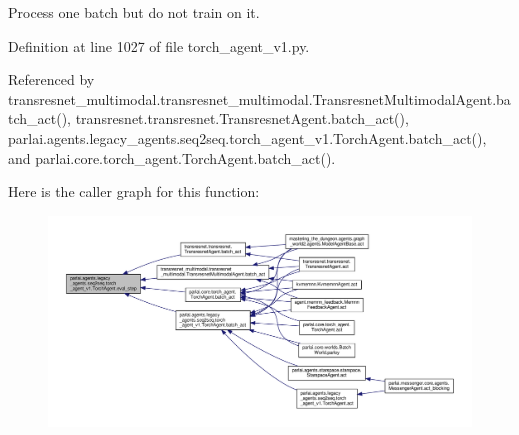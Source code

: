 \begin{DoxyVerb}Process one batch but do not train on it.\end{DoxyVerb}
 

Definition at line 1027 of file torch\+\_\+agent\+\_\+v1.\+py.



Referenced by transresnet\+\_\+multimodal.\+transresnet\+\_\+multimodal.\+Transresnet\+Multimodal\+Agent.\+batch\+\_\+act(), transresnet.\+transresnet.\+Transresnet\+Agent.\+batch\+\_\+act(), parlai.\+agents.\+legacy\+\_\+agents.\+seq2seq.\+torch\+\_\+agent\+\_\+v1.\+Torch\+Agent.\+batch\+\_\+act(), and parlai.\+core.\+torch\+\_\+agent.\+Torch\+Agent.\+batch\+\_\+act().

Here is the caller graph for this function\+:
\nopagebreak
\begin{figure}[H]
\begin{center}
\leavevmode
\includegraphics[width=350pt]{classparlai_1_1agents_1_1legacy__agents_1_1seq2seq_1_1torch__agent__v1_1_1TorchAgent_a801f2b9a359201fd0a395ab61fd61806_icgraph}
\end{center}
\end{figure}
\mbox{\label{classparlai_1_1agents_1_1legacy__agents_1_1seq2seq_1_1torch__agent__v1_1_1TorchAgent_a8984452b8b4e6194625530aeae49b243}} 
